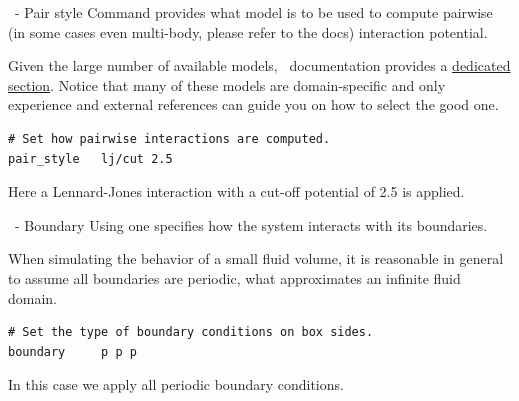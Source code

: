\begin{frame}[fragile]{\secname}{\subsecname\ - Pair style}
Command  provides what model is to be used to compute pairwise (in some cases even multi-body, please refer to the docs) interaction potential.

\vspace{0.5cm}

Given the large number of available models, \LAMMPS\ documentation provides a \href{https://docs.lammps.org/pairs.html}{dedicated section}. Notice that many of these models are domain-specific and only experience and external references can guide you on how to select the good one.

\vspace{0.5cm}

\begin{lstlisting}[language=LAMMPS,basicstyle=\small]
# Set how pairwise interactions are computed.
pair_style   lj/cut 2.5
\end{lstlisting}

\vspace{0.5cm}
Here a Lennard-Jones interaction with a cut-off potential of 2.5 is applied.
\end{frame}

\begin{frame}[fragile]{\secname}{\subsecname\ - Boundary}
Using  one specifies how the system interacts with its boundaries.

\vspace{0.5cm}

When simulating the behavior of a small fluid volume, it is reasonable in general to assume all boundaries are periodic, what approximates an infinite fluid domain.

\vspace{0.5cm}

\begin{lstlisting}[language=LAMMPS,basicstyle=\small]
# Set the type of boundary conditions on box sides.
boundary     p p p
\end{lstlisting}

\vspace{0.5cm}
In this case we apply all periodic boundary conditions.
\end{frame}

